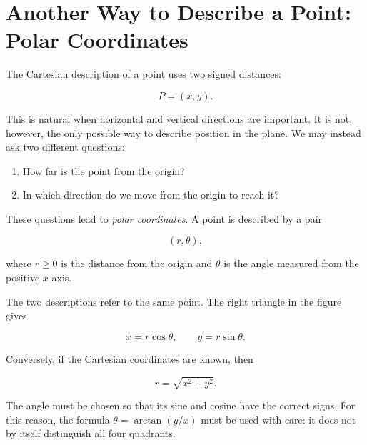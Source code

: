 \section{Another Way to Describe a Point: Polar Coordinates}

The Cartesian description of a point uses two signed distances:

\[
P=(x,y).
\]

This is natural when horizontal and vertical directions are important. It is not,
however, the only possible way to describe position in the plane. We may instead
ask two different questions:

\begin{enumerate}
    \item How far is the point from the origin?
    \item In which direction do we move from the origin to reach it?
\end{enumerate}

These questions lead to \emph{polar coordinates}. A point is described by a pair

\[
(r,\theta),
\]

where $r\geq 0$ is the distance from the origin and $\theta$ is the angle measured
from the positive $x$-axis.

\begin{center}
\end{center}

The two descriptions refer to the same point. The right triangle in the figure
gives

\[
x=r\cos\theta,
\qquad
y=r\sin\theta.
\]

Conversely, if the Cartesian coordinates are known, then

\[
r=\sqrt{x^2+y^2}.
\]

The angle must be chosen so that its sine and cosine have the correct signs. For
this reason, the formula $\theta=\arctan(y/x)$ must be used with care: it does not
by itself distinguish all four quadrants.


